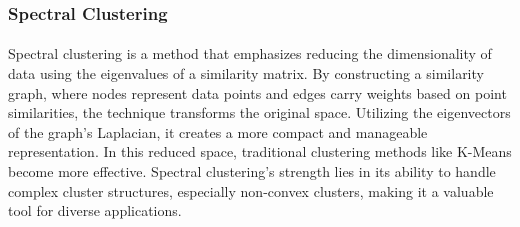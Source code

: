     \subsubsection{Spectral Clustering}
        \paragraph{}Spectral clustering\cite{von_luxburg_tutorial_2007} is a method that emphasizes reducing the dimensionality of data using the eigenvalues of a similarity matrix. By constructing a similarity graph, where nodes represent data points and edges carry weights based on point similarities, the technique transforms the original space. Utilizing the eigenvectors of the graph's Laplacian, it creates a more compact and manageable representation. In this reduced space, traditional clustering methods like K-Means become more effective. Spectral clustering's strength lies in its ability to handle complex cluster structures, especially non-convex clusters, making it a valuable tool for diverse applications.